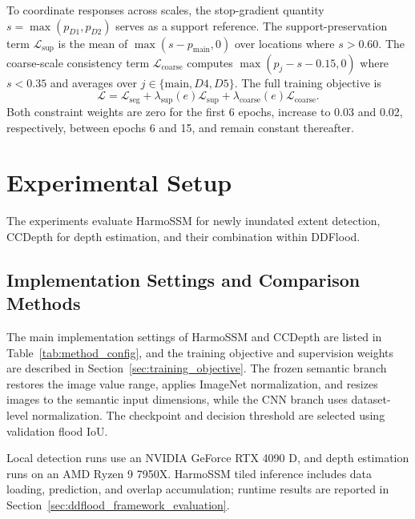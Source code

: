\documentclass[authoryear,preprint,12pt]{elsarticle}
\begin{document}
To coordinate responses across scales, the stop-gradient quantity \(s=\max(p_{D1},p_{D2})\) serves as a support reference. The support-preservation term \(\mathcal L_{\mathrm{sup}}\) is the mean of \(\max(s-p_{\mathrm{main}},0)\) over locations where \(s>0.60\). The coarse-scale consistency term \(\mathcal L_{\mathrm{coarse}}\) computes \(\max(p_j-s-0.15,0)\) where \(s<0.35\) and averages over \(j\in\{\mathrm{main},D4,D5\}\). The full training objective is
\begin{equation}\label{eq:total_loss}
  \mathcal{L}
  =
  \mathcal{L}_{\mathrm{seg}}
  +
  \lambda_{\mathrm{sup}}(e)\mathcal{L}_{\mathrm{sup}}
  +
  \lambda_{\mathrm{coarse}}(e)\mathcal{L}_{\mathrm{coarse}}.
\end{equation}
Both constraint weights are zero for the first 6 epochs, increase to 0.03 and 0.02, respectively, between epochs 6 and 15, and remain constant thereafter.

\endgroup

\section{Experimental Setup}\label{sec:eval_protocol}

The experiments evaluate HarmoSSM for newly inundated extent detection, CCDepth for depth estimation, and their combination within DDFlood.

\begingroup
\subsection{Implementation Settings and Comparison Methods}\label{sec:experiment_implementation}

The main implementation settings of HarmoSSM and CCDepth are listed in Table~\ref{tab:method_config}, and the training objective and supervision weights are described in Section~\ref{sec:training_objective}. The frozen semantic branch restores the image value range, applies ImageNet normalization, and resizes images to the semantic input dimensions, while the CNN branch uses dataset-level normalization. The checkpoint and decision threshold are selected using validation flood IoU.



Local detection runs use an NVIDIA GeForce RTX 4090 D, and depth estimation runs on an AMD Ryzen 9 7950X. HarmoSSM tiled inference includes data loading, prediction, and overlap accumulation; runtime results are reported in Section~\ref{sec:ddflood_framework_evaluation}.
\end{document}
